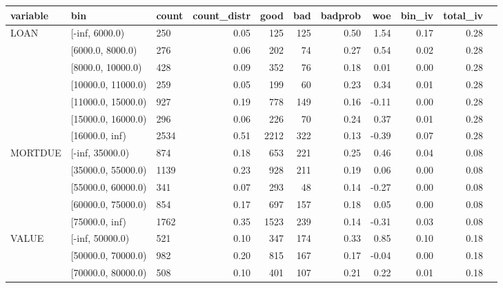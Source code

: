 \begin{landscape}
	\begin{figure}[!ht]
		\centering
		\begin{tabular}{lllrrrrrrrr}
			\toprule
			variable & bin &  count &  count\_distr &  good &  bad &   badprob &       woe &    bin\_iv &  total\_iv \\
			\midrule
			    LOAN &      [-inf, 6000.0) &    250 &         0.05 &   125 &  125 &     0.50 &  1.54 &    0.17 &      0.28 \\
     &    [6000.0, 8000.0) &    276 &         0.06 &   202 &   74 &     0.27 &  0.54 &    0.02 &      0.28 \\
     &   [8000.0, 10000.0) &    428 &         0.09 &   352 &   76 &     0.18 &  0.01 &    0.00 &      0.28 \\
     &  [10000.0, 11000.0) &    259 &         0.05 &   199 &   60 &     0.23 &  0.34 &    0.01 &      0.28 \\
     &  [11000.0, 15000.0) &    927 &         0.19 &   778 &  149 &     0.16 & -0.11 &    0.00 &      0.28 \\
     &  [15000.0, 16000.0) &    296 &         0.06 &   226 &   70 &     0.24 &  0.37 &    0.01 &      0.28 \\
     &      [16000.0, inf) &   2534 &         0.51 &  2212 &  322 &     0.13 & -0.39 &    0.07 &      0.28 \\
			\midrule
			 MORTDUE &     [-inf, 35000.0) &    874 &         0.18 &   653 &  221 &     0.25 &  0.46 &    0.04 &      0.08 \\
  &  [35000.0, 55000.0) &   1139 &         0.23 &   928 &  211 &     0.19 &  0.06 &    0.00 &      0.08 \\
  &  [55000.0, 60000.0) &    341 &         0.07 &   293 &   48 &     0.14 & -0.27 &    0.00 &      0.08 \\
  &  [60000.0, 75000.0) &    854 &         0.17 &   697 &  157 &     0.18 &  0.05 &    0.00 &      0.08 \\
  &      [75000.0, inf) &   1762 &         0.35 &  1523 &  239 &     0.14 & -0.31 &    0.03 &      0.08 \\
			\midrule
			   VALUE &       [-inf, 50000.0) &    521 &         0.10 &   347 &  174 &     0.33 &  0.85 &    0.10 &      0.18 \\
    &    [50000.0, 70000.0) &    982 &         0.20 &   815 &  167 &     0.17 & -0.04 &    0.00 &      0.18 \\
    &    [70000.0, 80000.0) &    508 &         0.10 &   401 &  107 &     0.21 &  0.22 &    0.01 &      0.18 \\

\end{tabular}
\end{figure}
\end{landscape}
